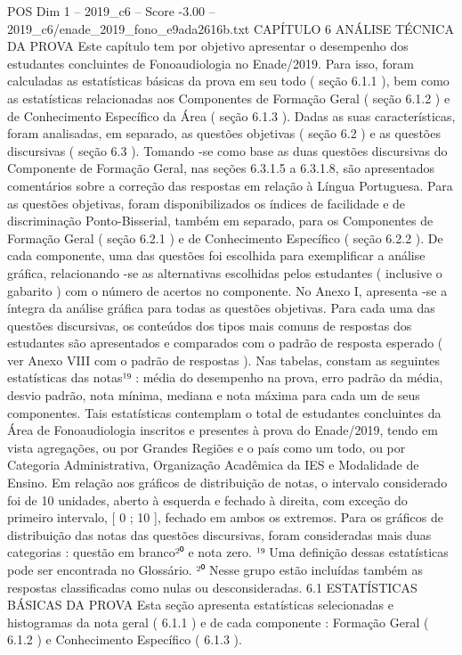 \begin{textsample}{POS Dim 1 – 2019\_c6 – Score -3.00 – 2019\_c6/enade\_2019\_fono\_e9ada2616b.txt}  \label{ex:f1_pos_356}
CAPÍTULO 6 ANÁLISE TÉCNICA DA PROVA Este capítulo tem por objetivo apresentar o desempenho dos estudantes concluintes de Fonoaudiologia no Enade/2019.
Para isso, foram calculadas as estatísticas básicas da prova em seu todo ( seção 6.1.1 ), bem como as estatísticas relacionadas aos Componentes de Formação Geral ( seção 6.1.2 ) e de Conhecimento Específico da Área ( seção 6.1.3 ).
Dadas as suas características, foram analisadas, em separado, as questões objetivas ( seção 6.2 ) e as questões discursivas ( seção 6.3 ).
Tomando -se como base as duas questões discursivas do Componente de Formação Geral, nas seções 6.3.1.5 a 6.3.1.8, são apresentados comentários sobre a correção das respostas em relação à Língua Portuguesa.
Para as questões objetivas, foram disponibilizados os índices de facilidade e de discriminação Ponto-Bisserial, também em separado, para os Componentes de Formação Geral ( seção 6.2.1 ) e de Conhecimento Específico ( seção 6.2.2 ).
De cada componente, uma das questões foi escolhida para exemplificar a análise gráfica, relacionando -se as alternativas escolhidas pelos estudantes ( inclusive o gabarito ) com o número de acertos no componente.
No Anexo I, apresenta -se a íntegra da análise gráfica para todas as questões objetivas.
Para cada uma das questões discursivas, os conteúdos dos tipos mais comuns de respostas dos estudantes são apresentados e comparados com o padrão de resposta esperado ( ver Anexo VIII com o padrão de respostas ).
Nas tabelas, constam as seguintes estatísticas das notas¹⁹ : média do desempenho na prova, erro padrão da média, desvio padrão, nota mínima, mediana e nota máxima para cada um de seus componentes.
Tais estatísticas contemplam o total de estudantes concluintes da Área de Fonoaudiologia inscritos e presentes à prova do Enade/2019, tendo em vista agregações, ou por Grandes Regiões e o país como um todo, ou por Categoria Administrativa, Organização Acadêmica da IES e Modalidade de Ensino.
Em relação aos gráficos de distribuição de notas, o intervalo considerado foi de 10 unidades, aberto à esquerda e fechado à direita, com exceção do primeiro intervalo, [ 0 ; 10 ], fechado em ambos os extremos.
Para os gráficos de distribuição das notas das questões discursivas, foram consideradas mais duas categorias : questão em branco²⁰ e nota zero. ¹⁹ Uma definição dessas estatísticas pode ser encontrada no Glossário. ²⁰ Nesse grupo estão incluídas também as respostas classificadas como nulas ou desconsideradas. 6.1 ESTATÍSTICAS BÁSICAS DA PROVA Esta seção apresenta estatísticas selecionadas e histogramas da nota geral ( 6.1.1 ) e de cada componente : Formação Geral ( 6.1.2 ) e Conhecimento Específico ( 6.1.3 ).

\end{textsample}
